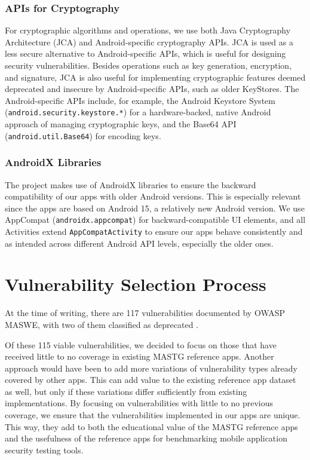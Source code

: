 \subsubsection{APIs for Cryptography}
For cryptographic algorithms and operations, we use both Java Cryptography Architecture (JCA) and Android-specific cryptography APIs. JCA is used as a less secure alternative to Android-specific APIs, which is useful for designing security vulnerabilities. Besides operations such as key generation, encryption, and signature, JCA is also useful for implementing cryptographic features deemed deprecated and insecure by Android-specific APIs, such as older KeyStores. The Android-specific APIs include, for example, the Android Keystore System (\texttt{android.security.keystore.*}) for a hardware-backed, native Android approach of managing cryptographic keys, and the Base64 API (\texttt{android.util.Base64}) for encoding keys.

\subsubsection{AndroidX Libraries}
The project makes use of AndroidX libraries to ensure the backward compatibility of our apps with older Android versions. This is especially relevant since the apps are based on Android 15, a relatively new Android version. We use AppCompat (\texttt{androidx.appcompat}) for backward-compatible UI elements, and all Activities extend \texttt{AppCompatActivity} to ensure our apps behave consistently and as intended across different Android API levels, especially the older ones.


\section{Vulnerability Selection Process}
At the time of writing, there are 117 vulnerabilities documented by OWASP MASWE, with two of them classified as deprecated \cite{owasp_maswe_website}. 

Of these 115 viable vulnerabilities, we decided to focus on those that have received little to no coverage in existing MASTG reference apps. Another approach would have been to add more variations of vulnerability types already covered by other apps. This can add value to the existing reference app dataset as well, but only if these variations differ sufficiently from existing implementations. By focusing on vulnerabilities with little to no previous coverage, we ensure that the vulnerabilities implemented in our apps are unique. This way, they add to both the educational value of the MASTG reference apps and the usefulness of the reference apps for benchmarking mobile application security testing tools.

